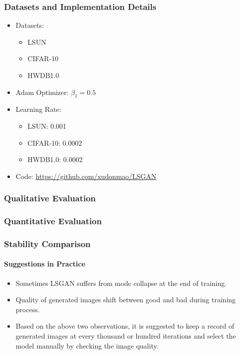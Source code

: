 \documentclass{article}
\begin{document}
    \subsubsection{Datasets and Implementation Details}\label{subsubsec:Least_Squares_Generative_Adversarial_Networks_(LS_GAN)_ICCV_2017:datasets-and-implementation-details}
    \begin{itemize}
        \item Datasets:
        \begin{itemize}
            \item LSUN
            \item CIFAR-10
            \item HWDB1.0
        \end{itemize}
        \item Adam Optimizer: $\beta_1=0.5$
        \item Learning Rate:
        \begin{itemize}
            \item LSUN: 0.001
            \item CIFAR-10: 0.0002
            \item HWDB1.0: 0.0002
        \end{itemize}
        \item Code: \url{https://github.com/xudonmao/LSGAN}
    \end{itemize}

    \subsubsection{Qualitative Evaluation}\label{subsubsec:Least_Squares_Generative_Adversarial_Networks_(LS_GAN)_ICCV_2017:qualitative-evaluation}

    \subsubsection{Quantitative Evaluation}\label{subsubsec:Least_Squares_Generative_Adversarial_Networks_(LS_GAN)_ICCV_2017:quantitative-evaluation}

    \subsubsection{Stability Comparison}\label{subsubsec:Least_Squares_Generative_Adversarial_Networks_(LS_GAN)_ICCV_2017:stability-comparison}

    \paragraph{Suggestions in Practice}
    \begin{itemize}
        \item Sometimes LSGAN suffers from mode collapse at the end of training.
        \item Quality of generated images shift between good and bad during training process.
        \item Based on the above two observations, it is suggested to keep a record of generated images at every thousand or hundred iterations and select the model manually by checking the image quality.
    \end{itemize}
\end{document}
